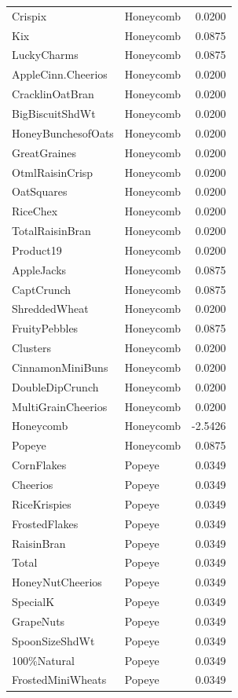 \begin{longtable}{llr}
Crispix & Honeycomb & 0.0200 \\
Kix & Honeycomb & 0.0875 \\
LuckyCharms & Honeycomb & 0.0875 \\
AppleCinn.Cheerios & Honeycomb & 0.0200 \\
CracklinOatBran & Honeycomb & 0.0200 \\
BigBiscuitShdWt & Honeycomb & 0.0200 \\
HoneyBunchesofOats & Honeycomb & 0.0200 \\
GreatGraines & Honeycomb & 0.0200 \\
OtmlRaisinCrisp & Honeycomb & 0.0200 \\
OatSquares & Honeycomb & 0.0200 \\
RiceChex & Honeycomb & 0.0200 \\
TotalRaisinBran & Honeycomb & 0.0200 \\
Product19 & Honeycomb & 0.0200 \\
AppleJacks & Honeycomb & 0.0875 \\
CaptCrunch & Honeycomb & 0.0875 \\
ShreddedWheat & Honeycomb & 0.0200 \\
FruityPebbles & Honeycomb & 0.0875 \\
Clusters & Honeycomb & 0.0200 \\
CinnamonMiniBuns & Honeycomb & 0.0200 \\
DoubleDipCrunch & Honeycomb & 0.0200 \\
MultiGrainCheerios & Honeycomb & 0.0200 \\
Honeycomb & Honeycomb & -2.5426 \\
Popeye & Honeycomb & 0.0875 \\
CornFlakes & Popeye & 0.0349 \\
Cheerios & Popeye & 0.0349 \\
RiceKrispies & Popeye & 0.0349 \\
FrostedFlakes & Popeye & 0.0349 \\
RaisinBran & Popeye & 0.0349 \\
Total & Popeye & 0.0349 \\
HoneyNutCheerios & Popeye & 0.0349 \\
SpecialK & Popeye & 0.0349 \\
GrapeNuts & Popeye & 0.0349 \\
SpoonSizeShdWt & Popeye & 0.0349 \\
100\%Natural & Popeye & 0.0349 \\
FrostedMiniWheats & Popeye & 0.0349 \\

\end{longtable}
